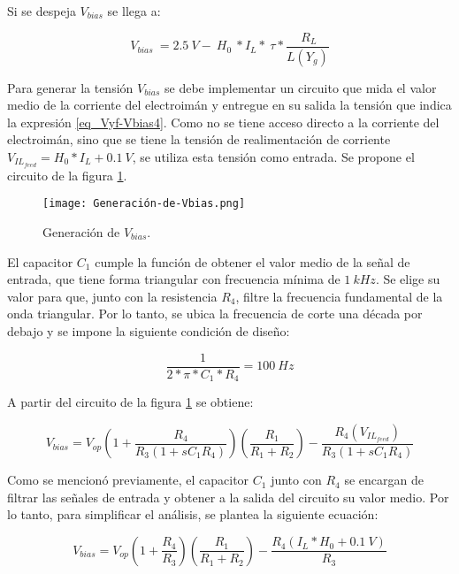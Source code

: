Si se despeja $V_{bias}$ se llega a:

\begin{equation} \label{eq_Vyf-Vbias4}
	V_{bias}\ =2.5 \:V -\ H_0\ *I_L*\ \tau *\frac{\ R_L}{L(Y_g)}
\end{equation}

Para generar la tensión $V_{bias}$ se debe implementar un circuito que mida el valor medio de la corriente del electroimán y entregue en su salida la tensión que indica la expresión \ref{eq_Vyf-Vbias4}. Como no se tiene acceso directo a la corriente del electroimán, sino que se tiene la tensión de realimentación de corriente $V_{IL_{feed}}=H_0*I_L+0.1\:V$, se utiliza esta tensión como entrada. Se propone el circuito de la figura \ref{fig:img_Generación_de_Vbias}.

\begin{figure}[H]
	\centering
	\texttt{[image: Generación-de-Vbias.png]}
	\caption{Generación de $V_{bias}$.}
	\label{fig:img_Generación_de_Vbias}
\end{figure}

El capacitor $C_1$ cumple la función de obtener el valor medio de la señal de entrada, que tiene forma triangular con frecuencia mínima de $1\:kHz$. Se elige su valor para que, junto con la resistencia $R_4$, filtre la frecuencia fundamental de la onda triangular. Por lo tanto, se ubica la frecuencia de corte una década por debajo y se impone la siguiente condición de diseño:

\begin{equation} \label{eq_capacitor_IR}
	\frac{1}{2*\pi*C_1*R_4}=100\:Hz
\end{equation}



A partir del circuito de la figura \ref{fig:img_Generación_de_Vbias} se obtiene:

\begin{equation} \label{eq_Vyf-Vbias3}
	V_{bias} =V_{op}(1+\frac{ R_4}{R_3(1+sC_1R_4)})(\frac{R_1}{R_1+R_2})-\frac{R_4(V_{IL_{feed}})}{R_3(1+s C_1R_4)}
\end{equation}

Como se mencionó previamente, el capacitor $C_1$ junto con $R_4$ se encargan de filtrar las señales de entrada y obtener a la salida del circuito su valor medio. Por lo tanto, para simplificar el análisis, se plantea la siguiente ecuación:

\begin{equation} 
	V_{bias} =V_{op}(1+\frac{ R_4}{R_3})(\frac{R_1}{R_1+R_2})-\frac{R_4(I_L*H_0+0.1\:V)}{R_3}
\end{equation}


